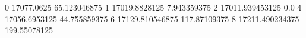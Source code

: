 0 17077.0625 65.123046875
1 17019.8828125 7.943359375
2 17011.939453125 0.0
4 17056.6953125 44.755859375
6 17129.810546875 117.87109375
8 17211.490234375 199.55078125
